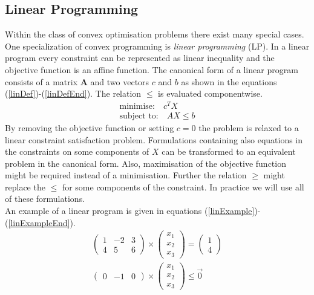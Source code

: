 \subsection{Linear Programming}
\label{sec:MathLinearProgram}
Within the class of convex optimisation problems there exist many special cases. One specialization of convex programming is \emph{linear programming} (LP).
In a linear program every constraint can be represented as linear inequality and the objective function is an affine function. 
The canonical form of a linear program consists of a matrix $\mathbf{A}$ and two vectors ${c}$ and ${b}$ as shown in the equations (\ref{linDef})-(\ref{linDefEnd}). The relation $\leq$ is evaluated componentwise.
\begin{eqnarray}
\label{linDef}
\text{minimise:}\quad {c}^TX \\
\label{linDefEnd}
\text{subject to:}\quad AX\leq{b}
\end{eqnarray}
By removing the objective function or setting ${c} = {0} $ the problem is relaxed to a linear constraint satisfaction problem. Formulations containing also equations in the constraints on some components of $X$ can be transformed to an equivalent problem in the canonical form. Also, maximisation of the objective function might be required instead of a minimisation. Further the relation $\geq$ might replace the $\leq$ for some components of the constraint. In practice we will use all of these formulations.\\
An example of a linear program is given in equations (\ref{linExample})-(\ref{linExampleEnd}).
\begin{eqnarray}
\label{linExample}
\begin{pmatrix}
1 & -2 & 3 \\
4 & 5 & 6 
\end{pmatrix}\times\begin{pmatrix}
x_1 \\ x_2 \\ x_3
\end{pmatrix} = \begin{pmatrix}
1 \\ 4
\end{pmatrix}\\
\begin{pmatrix}
0&-1&0
\end{pmatrix}\times\begin{pmatrix}
x_1 \\ x_2 \\ x_3
\label{linExampleEnd}
\end{pmatrix}\leq \vec{0}
\end{eqnarray}

